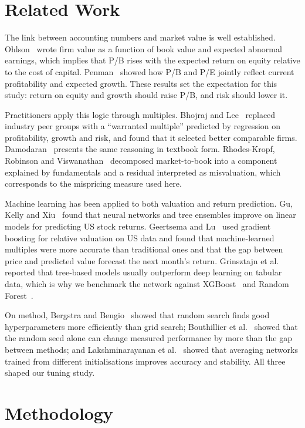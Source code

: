 \documentclass[conference]{IEEEtran}
\begin{document}
\section{Related Work}
The link between accounting numbers and market value is well established. Ohlson~\cite{ohlson1995} wrote firm value as a function of book value and expected abnormal earnings, which implies that P/B rises with the expected return on equity relative to the cost of capital. Penman~\cite{penman1996} showed how P/B and P/E jointly reflect current profitability and expected growth. These results set the expectation for this study: return on equity and growth should raise P/B, and risk should lower it.

Practitioners apply this logic through multiples. Bhojraj and Lee~\cite{bhojraj2002} replaced industry peer groups with a ``warranted multiple'' predicted by regression on profitability, growth and risk, and found that it selected better comparable firms. Damodaran~\cite{damodaran2012} presents the same reasoning in textbook form. Rhodes-Kropf, Robinson and Viswanathan~\cite{rhodes2005} decomposed market-to-book into a component explained by fundamentals and a residual interpreted as misvaluation, which corresponds to the mispricing measure used here.

Machine learning has been applied to both valuation and return prediction. Gu, Kelly and Xiu~\cite{gu2020} found that neural networks and tree ensembles improve on linear models for predicting US stock returns. Geertsema and Lu~\cite{geertsema2023} used gradient boosting for relative valuation on US data and found that machine-learned multiples were more accurate than traditional ones and that the gap between price and predicted value forecast the next month's return. Grinsztajn et al.~\cite{grinsztajn2022} reported that tree-based models usually outperform deep learning on tabular data, which is why we benchmark the network against XGBoost~\cite{chen2016} and Random Forest~\cite{breiman2001}.

On method, Bergstra and Bengio~\cite{bergstra2012} showed that random search finds good hyperparameters more efficiently than grid search; Bouthillier et al.~\cite{bouthillier2021} showed that the random seed alone can change measured performance by more than the gap between methods; and Lakshminarayanan et al.~\cite{lakshminarayanan2017} showed that averaging networks trained from different initialisations improves accuracy and stability. All three shaped our tuning study.

\section{Methodology}
\end{document}
